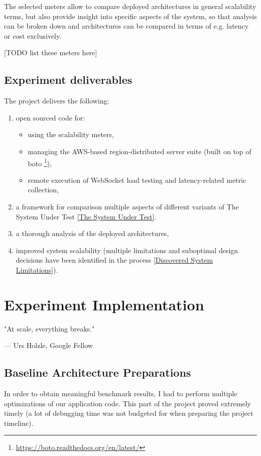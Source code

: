 \documentclass{uvamscse}
\begin{document}
The selected meters allow to compare deployed architectures in general scalability terms, but also provide insight into specific aspects of the system, so that analysis can be broken down and architectures can be compared in terms of e.g. latency or cost exclusively.

[TODO list these meters here]

\section{Experiment deliverables}\label{Experiment deliverables}

The project delivers the following:
\begin{enumerate}
  \item open sourced code for:
  \begin{itemize}
    \item using the scalability meters,
    \item managing the AWS-based region-distributed server suite (built on top of boto \footnote{\url{https://boto.readthedocs.org/en/latest/}}),
    \item remote execution of WebSocket load testing and latency-related metric collection,
  \end{itemize}
  \item a framework for comparison multiple aspects of different variants of The System Under Test \ref{The System Under Test}.
  \item a thorough analysis of the deployed architectures,
  \item improved system scalability (multiple limitations and suboptimal design decisions have been identified in the process \ref{Discovered System Limitations}).
\end{enumerate}


\chapter{Experiment Implementation} \label{Experiment Implementation}

\epigraph{"At scale, everything breaks."}{--- Urs Holzle, Google Fellow}

\section{Baseline Architecture Preparations}\label{Baseline Architecture Preparations}
In order to obtain meaningful benchmark results, I had to perform multiple optimizations of our application code. This part of the project proved extremely timely (a lot of debugging time was not budgeted for when preparing the project timeline).
\end{document}
